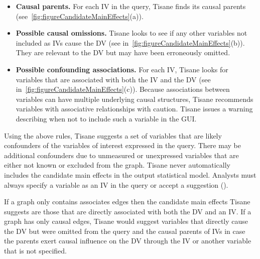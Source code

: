 \begin{itemize}    
    \item \textbf{Causal parents.} For each IV in the query, Tisane finds its
    causal parents (see~\autoref{fig:figureCandidateMainEffects}(a)).
    \item \textbf{Possible causal omissions.} Tisane looks to see if any other
    variables not included as IVs cause the DV 
    (see
    in~\autoref{fig:figureCandidateMainEffects}(b)). They are relevant to the DV
    but may have been erroneously omitted.
    \item \textbf{Possible confounding associations.} For each IV, Tisane looks
    for variables that are associated with both the IV and the DV (see
    in~\autoref{fig:figureCandidateMainEffects}(c)). Because associations
    between variables can have multiple underlying causal structures, Tisane
    recommends variables with associative relationships with caution. Tisane
    issues a warning describing when not to include such a variable in the GUI.
\end{itemize}

\figureCandidateMainEffects


Using the above rules, Tisane suggests a set of variables that are likely
confounders of the variables of interest expressed in the query. There may be
additional confounders due to unmeasured or unexpressed variables that are either
not known or excluded from the graph. Tisane never automatically includes the
candidate main effects in the output statistical model. Analysts must always
specify a variable as an IV in the query or accept a suggestion (\dcGuidance).

If a graph only contains associates edges then the candidate main effects Tisane
suggests are those that are directly associated with both the DV and an IV. If a
graph has only causal edges, Tisane would suggest variables that directly cause
the DV but were omitted from the query and the causal parents of IVs in case the
parents exert causal influence on the DV through the IV or another variable that is not
specified.

